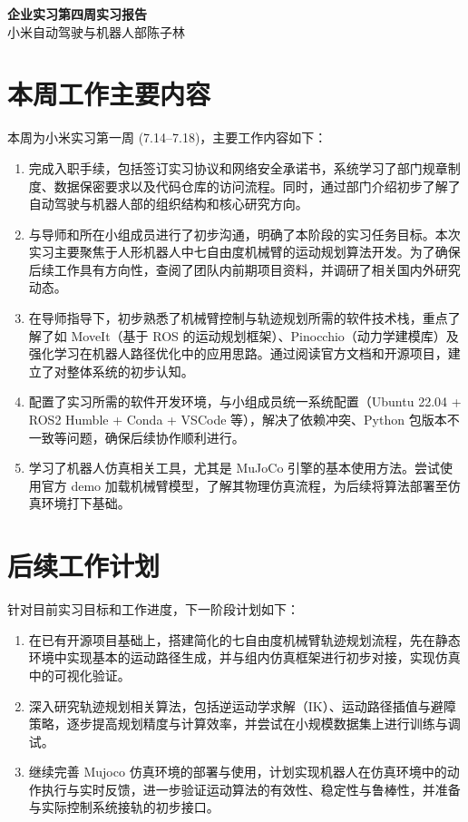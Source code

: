 \documentclass{ctexart}
\begin{document}
\begin{center}
    \LARGE \textbf{企业实习\;第四周实习报告}\\
    \vspace{10pt}
    \normalsize 小米自动驾驶与机器人部\;\;陈子林
\end{center}

\section{本周工作主要内容}

本周为小米实习第一周 (7.14--7.18)，主要工作内容如下：

\begin{enumerate}
    \item 完成入职手续，包括签订实习协议和网络安全承诺书，系统学习了部门规章制度、数据保密要求以及代码仓库的访问流程。同时，通过部门介绍初步了解了自动驾驶与机器人部的组织结构和核心研究方向。

    \item 与导师和所在小组成员进行了初步沟通，明确了本阶段的实习任务目标。本次实习主要聚焦于人形机器人中七自由度机械臂的运动规划算法开发。为了确保后续工作具有方向性，查阅了团队内前期项目资料，并调研了相关国内外研究动态。

    \item 在导师指导下，初步熟悉了机械臂控制与轨迹规划所需的软件技术栈，重点了解了如 MoveIt（基于 ROS 的运动规划框架）、Pinocchio（动力学建模库）及强化学习在机器人路径优化中的应用思路。通过阅读官方文档和开源项目，建立了对整体系统的初步认知。

    \item 配置了实习所需的软件开发环境，与小组成员统一系统配置（Ubuntu 22.04 + ROS2 Humble + Conda + VSCode 等），解决了依赖冲突、Python 包版本不一致等问题，确保后续协作顺利进行。

    \item 学习了机器人仿真相关工具，尤其是 MuJoCo 引擎的基本使用方法。尝试使用官方 demo 加载机械臂模型，了解其物理仿真流程，为后续将算法部署至仿真环境打下基础。
\end{enumerate}

\section{后续工作计划}

针对目前实习目标和工作进度，下一阶段计划如下：

\begin{enumerate}
    \item 在已有开源项目基础上，搭建简化的七自由度机械臂轨迹规划流程，先在静态环境中实现基本的运动路径生成，并与组内仿真框架进行初步对接，实现仿真中的可视化验证。

    \item 深入研究轨迹规划相关算法，包括逆运动学求解（IK）、运动路径插值与避障策略，逐步提高规划精度与计算效率，并尝试在小规模数据集上进行训练与调试。

    \item 继续完善 Mujoco 仿真环境的部署与使用，计划实现机器人在仿真环境中的动作执行与实时反馈，进一步验证运动算法的有效性、稳定性与鲁棒性，并准备与实际控制系统接轨的初步接口。
\end{enumerate}
\end{document}
